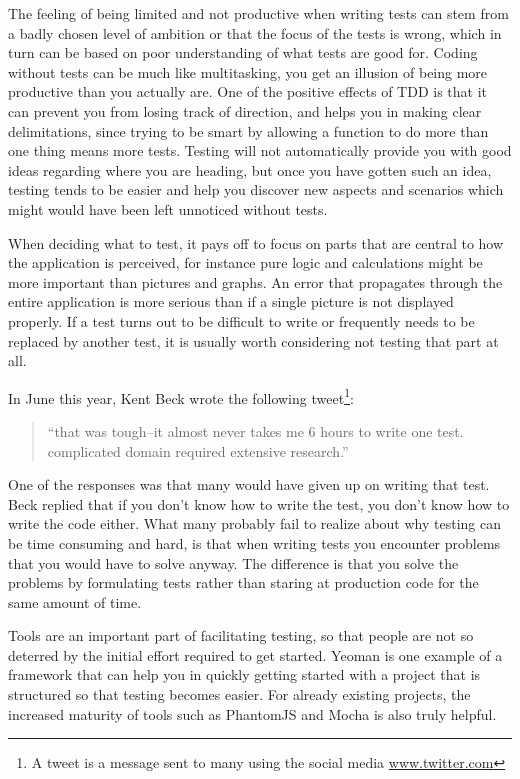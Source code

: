 \documentclass[11pt]{article}
\begin{document}
The feeling of being limited and not productive when writing tests can stem from a badly chosen level of ambition or that the focus of the tests is wrong, which in turn can be based on poor understanding of what tests are good for. Coding without tests can be much like multitasking, you get an illusion of being more productive than you actually are. One of the positive effects of TDD is that it can prevent you from losing track of direction, and helps you in making clear delimitations, since trying to be smart by allowing a function to do more than one thing means more tests. Testing will not automatically provide you with good ideas regarding where you are heading, but once you have gotten such an idea, testing tends to be easier and help you discover new aspects and scenarios which might would have been left unnoticed without tests. \cite[question~8]{Edelstam}

When deciding what to test, it pays off to focus on parts that are central to how the application is perceived, for instance pure logic and calculations might be more important than pictures and graphs. An error that propagates through the entire application is more serious than if a single picture is not displayed properly. If a test turns out to be difficult to write or frequently needs to be replaced by another test, it is usually worth considering not testing that part at all. \cite[questions~9-10]{Edelstam}

In June this year, Kent Beck wrote the following tweet\footnote{A tweet is a message sent to many using the social media \url{www.twitter.com}}:

\begin{quote}
``that was tough--it almost never takes me 6 hours to write one test. complicated domain required extensive research.''
\end{quote}

One of the responses was that many would have given up on writing that test. Beck replied that if you don't know how to write the test, you don't know how to write the code either\cite{TwitterKentBeck}. What many probably fail to realize about why testing can be time consuming and hard, is that when writing tests you encounter problems that you would have to solve anyway. The difference is that you solve the problems by formulating tests rather than staring at production code for the same amount of time. \cite[question~11]{Edelstam}

Tools are an important part of facilitating testing, so that people are not so deterred by the initial effort required to get started. Yeoman is one example of a framework that can help you in quickly getting started with a project that is structured so that testing becomes easier. For already existing projects, the increased maturity of tools such as PhantomJS and Mocha is also truly helpful. \cite[questions~11-12 and 20]{Edelstam}
\end{document}
